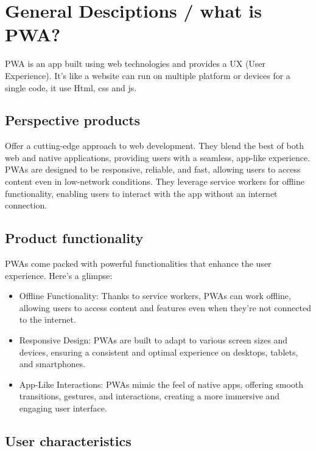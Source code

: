 \documentclass[12pt,a4paper, twosite]{article}
\begin{document}
\section{General Desciptions / what is PWA?}
\label{sec:orgc1c4017}

PWA is an app built using web technologies and provides a UX (User Experience). It's like a website can run on multiple platform or devices for a single code, it use Html, css and js.

\subsection{Perspective products}
\label{sec:org24980a8}

Offer a cutting-edge approach to web development. They blend the best of both web and native applications, providing users with a seamless, app-like experience. PWAs are designed to be responsive, reliable, and fast, allowing users to access content even in low-network conditions. They leverage service workers for offline functionality, enabling users to interact with the app without an internet connection. 


\subsection{Product functionality}
\label{sec:orgaf51da6}

PWAs come packed with powerful functionalities that enhance the user experience. Here's a glimpse:

\begin{itemize}
  \item Offline Functionality: Thanks to service workers, PWAs can work offline, allowing users to access content and features even when they're not connected to the internet.

  \item Responsive Design: PWAs are built to adapt to various screen sizes and devices, ensuring a consistent and optimal experience on desktops, tablets, and smartphones.
  
  \item App-Like Interactions: PWAs mimic the feel of native apps, offering smooth transitions, gestures, and interactions, creating a more immersive and engaging user interface.
\end{itemize}


\subsection{User characteristics}
\label{sec:orga40b0ee}
\end{document}
